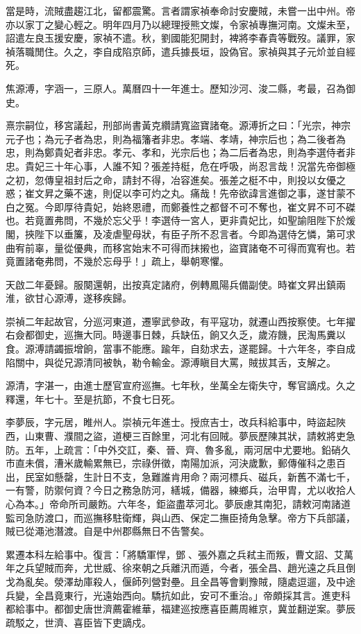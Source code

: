 \begin{pinyinscope}
當是時，流賊盡趨江北，留都震驚。言者謂家禎奉命討安慶賊，未嘗一出中州。帝亦以家丁之變心輕之。明年四月乃以總理授熊文燦，令家禎專撫河南。文燦未至，詔遣左良玉援安慶，家禎不遣。秋，劉國能犯開封，裨將李春貴等戰歿。議罪，家禎落職閒住。久之，李自成陷京師，遣兵據長垣，設偽官。家禎與其子元炌並自經死。

焦源溥，字涵一，三原人。萬曆四十一年進士。歷知沙河、浚二縣，考最，召為御史。

熹宗嗣位，移宮議起，刑部尚書黃克纘請寬盜寶諸奄。源溥折之曰：「光宗，神宗元子也；為元子者為忠，則為福籓者非忠。孝端、孝靖，神宗后也；為二後者為忠，則為鄭貴妃者非忠。孝元、孝和，光宗后也；為二后者為忠，則為李選侍者非忠。貴妃三十年心事，人誰不知？張差持梃，危在呼吸，尚忍言哉！況當先帝御極之初，忽傳皇祖封后之命，請封不得，冶容進矣。張差之梃不中，則投以女優之惑；崔文昇之藥不速，則促以李可灼之丸。痛哉！先帝欲諱言進御之事，遂甘蒙不白之冤。今即厚待貴妃，始終恩禮，而鄭養性之都督不可不奪也，崔文昇不可不磔也。若竟置弗問，不幾於忘父乎！李選侍一宮人，更非貴妃比，如聖諭阻陛下於煖閣，挾陛下以垂簾，及凌虐聖母狀，有臣子所不忍言者。今即為選侍乞憐，第可求曲宥前辜，量從優典，而移宮始末不可得而抹摋也，盜寶諸奄不可得而寬宥也。若竟置諸奄弗問，不幾於忘母乎！」疏上，舉朝寒懼。

天啟二年憂歸。服闋還朝，出按真定諸府，例轉鳳陽兵備副使。時崔文昇出鎮兩淮，欲甘心源溥，遂移疾歸。

崇禎二年起故官，分巡河東道，遷寧武參政，有平寇功，就遷山西按察使。七年擢右僉都御史，巡撫大同。時邊事日棘，兵缺伍，餉又久乏，歲洊饑，民淘馬糞以食。源溥請蠲振增餉，當事不能應。踰年，自劾求去，遂罷歸。十六年冬，李自成陷關中，與從兄源清同被執，勒令輸金。源溥瞋目大罵，賊拔其舌，支解之。

源清，字湛一，由進士歷官宣府巡撫。七年秋，坐萬全左衛失守，奪官謫戍。久之釋還，年七十。至是抗節，不食七日死。

李夢辰，字元居，睢州人。崇禎元年進士。授庶吉士，改兵科給事中，時盜起陜西，山東曹、濮間之盜，道梗三百餘里，河北有回賊。夢辰歷陳其狀，請敕將吏急防。五年，上疏言：「中外交訌，秦、晉、齊、魯多亂，兩河居中尤要地。鉛硝久市直未償，漕米歲輸累無已，宗祿併徵，南陽加派，河決歲歉，郵傳催科之患百出，民室如懸罄，生計日不支，急難誰肯用命？兩河標兵、磁兵，新舊不滿七千，一有警，防禦何資？今日之務急防河，繕城，備器，練鄉兵，治甲胄，尤以收拾人心為本。」帝命所司嚴飭。六年冬，鉅盜盡萃河北。夢辰慮其南犯，請敕河南諸道監司急防渡口，而巡撫移駐衛輝，與山西、保定二撫臣掎角急擊。帝方下兵部議，賊已從澠池潛渡。自是中州郡縣無日不告警矣。

累遷本科左給事中。復言：「將驕軍悍，鄧、張外嘉之兵弒主而叛，曹文詔、艾萬年之兵望賊而奔，尤世威、徐來朝之兵離汛而遁，今者，張全昌、趙光遠之兵且倒戈為亂矣。滎澤劫庫殺人，偃師列營對壘。且全昌等會剿豫賊，隨處逗遛，及中途兵變，全昌竟東行，光遠始西向。驕抗如此，安可不重治。」帝頗採其言。進吏科都給事中。都御史唐世濟薦霍維華，福建巡按應喜臣薦周維京，冀並翻逆案。夢辰疏駁之，世濟、喜臣皆下吏謫戍。


\end{pinyinscope}
